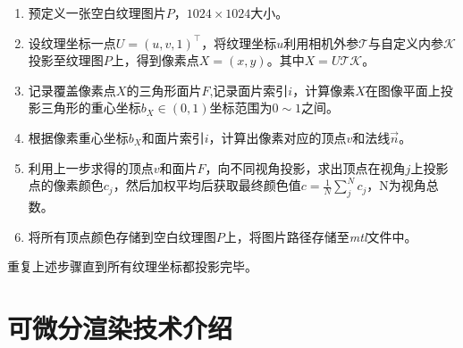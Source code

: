 \begin{enumerate}[label=(\arabic*)]
    \item 预定义一张空白纹理图片$P$，$1024 \times 1024$大小。
    \item 设纹理坐标一点$U = (u,v,1)^\top$，将纹理坐标$u$利用相机外参$\mathcal{T}$与自定义内参$\mathcal{K}$投影至纹理图$P$上，得到像素点$X=(x,y)$。其中$X = U\mathcal{T}\mathcal{K}$。
    \item 记录覆盖像素点$X$的三角形面片$F$,记录面片索引$i$，计算像素$X$在图像平面上投影三角形的重心坐标$b_X\in(0,1)$坐标范围为$0 \sim 1$之间。
    \item 根据像素重心坐标$b_X$和面片索引$i$，计算出像素对应的顶点$v$和法线$\vec{n}$。
    \item 利用上一步求得的顶点$v$和面片$F$，向不同视角投影，求出顶点在视角$j$上投影点的像素颜色$c_j$，然后加权平均后获取最终颜色值$c= \frac{1}{N}  \sum_j^N c_j $，N为视角总数。
    \item 将所有顶点颜色存储到空白纹理图$P$上，将图片路径存储至\emph{mtl}文件中。
\end{enumerate}
重复上述步骤直到所有纹理坐标都投影完毕。

%
%
\section{可微分渲染技术介绍}

